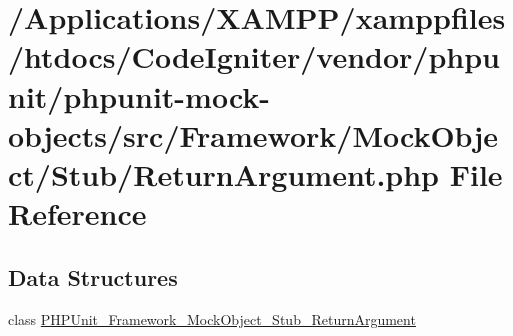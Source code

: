 \hypertarget{_return_argument_8php}{}\section{/\+Applications/\+X\+A\+M\+P\+P/xamppfiles/htdocs/\+Code\+Igniter/vendor/phpunit/phpunit-\/mock-\/objects/src/\+Framework/\+Mock\+Object/\+Stub/\+Return\+Argument.php File Reference}
\label{_return_argument_8php}
\subsection*{Data Structures}
\begin{DoxyCompactItemize}
\item 
class \mbox{\hyperlink{class_p_h_p_unit___framework___mock_object___stub___return_argument}{P\+H\+P\+Unit\+\_\+\+Framework\+\_\+\+Mock\+Object\+\_\+\+Stub\+\_\+\+Return\+Argument}}
\end{DoxyCompactItemize}

